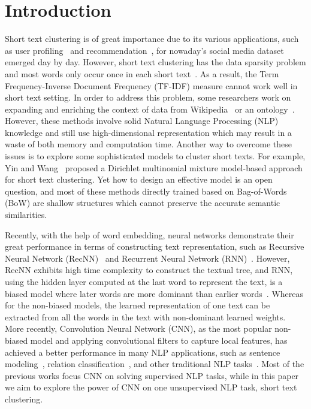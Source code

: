 \documentclass[review]{elsarticle}
\begin{document}
\section{Introduction}
\label{sec:Introduction}
Short text clustering is of great importance due to its various applications, such as user profiling~\cite{li-ritter-hovy:2014:P14-1} and recommendation~\cite{wang-EtAl:2010:ACL1}, for nowaday's social media dataset emerged day by day. However, short text clustering has the data sparsity problem and most words only occur once in each short text~\cite{15_aggarwal2012survey}. As a result, the Term Frequency-Inverse Document Frequency (TF-IDF) measure cannot work well in short text setting. In order to address this problem, some researchers work on expanding and enriching the context of data from Wikipedia~\cite{29_banerjee2007clustering} or an ontology~\cite{33_fodeh2011ontology}. However, these methods involve solid Natural Language Processing (NLP) knowledge and still use high-dimensional representation which may result in a waste of both memory and computation time. Another way to overcome these issues is to explore some sophisticated models to cluster short texts. For example, Yin and Wang~\cite{30_yin2014dirichlet} proposed a Dirichlet multinomial mixture model-based approach for short text clustering. Yet how to design an effective model is an open question, and most of these methods directly trained based on Bag-of-Words (BoW) are shallow structures which cannot preserve the accurate semantic similarities.

Recently, with the help of word embedding, neural networks demonstrate their great performance in terms of constructing text representation, such as Recursive Neural Network (RecNN)~\cite{24_socher2011semi,35_socher2013recursive} and Recurrent Neural Network (RNN)~\cite{38_mikolov2011extensions}. However, RecNN exhibits high time complexity to construct the textual tree, and RNN, using the hidden layer computed at the last word to represent the text, is a biased model where later words are more dominant than earlier words~\cite{14_lai2015rcnn}. Whereas for the non-biased models, the learned representation of one text can be extracted from all the words in the text with non-dominant learned weights. More recently, Convolution Neural Network (CNN), as the most popular non-biased model and applying convolutional filters to capture local features, has achieved a better performance in many NLP applications, such as sentence modeling~\cite{16_blunsom2014convolutional}, relation classification~\cite{34_zeng2014relation}, and other traditional NLP tasks~\cite{19_collobert2011natural}. Most of the previous works focus CNN on solving supervised NLP tasks, while in this paper we aim to explore the power of CNN on one unsupervised NLP task, short text clustering.
\end{document}
